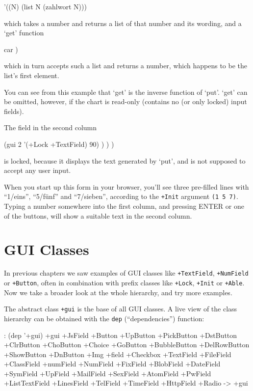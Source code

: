 \begin{wideverbatim}
'((N) (list N (zahlwort N)))
\end{wideverbatim}

which takes a number and returns a list of that number and its wording,
and a `get' function


\begin{wideverbatim}
car )
\end{wideverbatim}

which in turn accepts such a list and returns a number, which happens to
be the list's first element.

You can see from this example that `get' is the inverse function of
`put'. `get' can be omitted, however, if the chart is read-only
(contains no (or only locked) input fields).

The field in the second column


\begin{wideverbatim}
(gui 2 '(+Lock +TextField) 90) ) ) )
\end{wideverbatim}

is locked, because it displays the text generated by `put', and is not
supposed to accept any user input.

When you start up this form in your browser, you'll see three pre-filled
lines with ``1/eins'', ``5/f\"unf'' and ``7/sieben'', according to the \texttt{+Init}
argument \texttt{(1 5 7)}. Typing a number somewhere into the first column, and
pressing ENTER or one of the buttons, will show a suitable text in the
second column.


\section{GUI Classes}
\label{sec:appl-devel-gui-classes}

In previous chapters we saw examples of GUI classes like \texttt{+TextField},
\texttt{+NumField} or \texttt{+Button}, often in combination with prefix classes like
\texttt{+Lock}, \texttt{+Init} or \texttt{+Able}. Now we take a broader look at the whole
hierarchy, and try more examples.

The abstract class \texttt{+gui} is the base of all GUI classes. A live view of
the class hierarchy can be obtained with the \texttt{dep} (``dependencies'')
function:


\begin{wideverbatim}
: (dep '+gui)
+gui
   +JsField
   +Button
      +UpButton
      +PickButton
         +DstButton
      +ClrButton
      +ChoButton
         +Choice
      +GoButton
      +BubbleButton
      +DelRowButton
      +ShowButton
      +DnButton
   +Img
   +field
      +Checkbox
      +TextField
         +FileField
         +ClassField
         +numField
            +NumField
            +FixField
         +BlobField
         +DateField
         +SymField
         +UpField
         +MailField
         +SexField
         +AtomField
         +PwField
         +ListTextField
         +LinesField
         +TelField
         +TimeField
         +HttpField
      +Radio
-> +gui
\end{wideverbatim}

